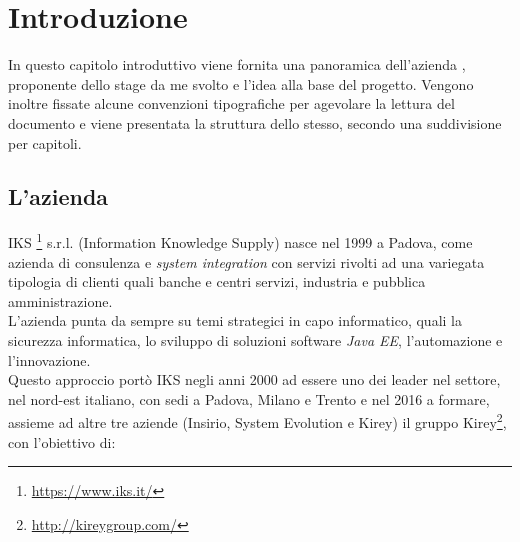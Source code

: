 
\pagestyle{IHA-fancy-style}
\chapter{Introduzione}
\label{cap:introduzione}

In questo capitolo introduttivo viene fornita una panoramica dell’azienda \myCompany, proponente dello stage da me svolto e l’idea alla base del progetto.
Vengono inoltre fissate alcune convenzioni tipografiche per agevolare la lettura del documento e viene presentata la struttura dello stesso, secondo una suddivisione per capitoli.




\section{L'azienda}

IKS \footnote{\url{https://www.iks.it/}} s.r.l. (Information Knowledge Supply) nasce nel 1999 a Padova, come azienda di consulenza e \textit{\gls{system integration}} con servizi rivolti ad una variegata tipologia di clienti quali banche e centri servizi, industria e pubblica amministrazione.\\

L'azienda punta da sempre su temi strategici in capo informatico, quali la sicurezza informatica, lo sviluppo di soluzioni software \textit{\gls{Java EE}}, l'automazione e l'innovazione. \\

Questo approccio portò IKS negli anni 2000 ad essere uno dei leader nel settore, nel nord-est italiano, con sedi a Padova, Milano e Trento e nel 2016 a formare, assieme ad altre tre aziende (Insirio, System Evolution e Kirey) il gruppo Kirey\footnote{\url{http://kireygroup.com/}}, con l'obiettivo di:

